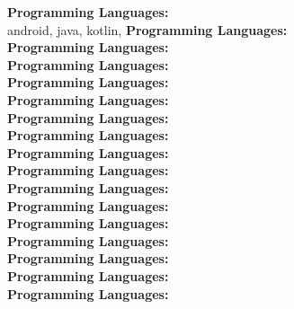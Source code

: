 \textbf{Programming Languages:} \\
android, java, kotlin, \textbf{Programming Languages:} \\
\textbf{Programming Languages:} \\
\textbf{Programming Languages:} \\
\textbf{Programming Languages:} \\
\textbf{Programming Languages:} \\
\textbf{Programming Languages:} \\
\textbf{Programming Languages:} \\
\textbf{Programming Languages:} \\
\textbf{Programming Languages:} \\
\textbf{Programming Languages:} \\
\textbf{Programming Languages:} \\
\textbf{Programming Languages:} \\
\textbf{Programming Languages:} \\
\textbf{Programming Languages:} \\
\textbf{Programming Languages:} \\
\textbf{Programming Languages:} \\
